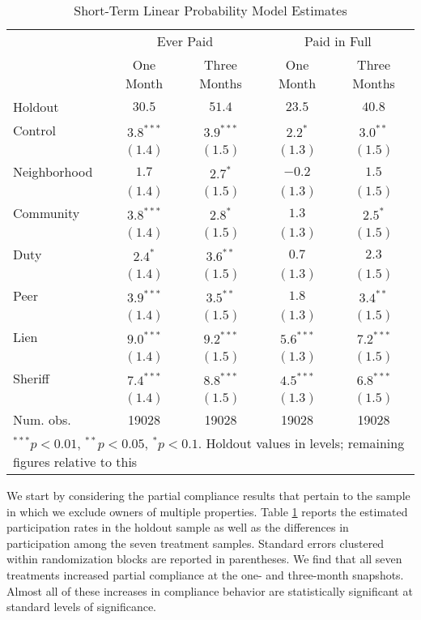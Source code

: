 \documentclass[12pt]{article}
\begin{document}
\begin{table}[ht]
\centering
\caption{Short-Term Linear Probability Model Estimates} \label{pc_lin}
\bigskip
\begin{tabular}{l c c c c }
\hline
 & \multicolumn{2}{c}{Ever Paid} & \multicolumn{2}{c}{Paid in Full} \\
          & One Month & Three Months & One Month & Three Months \\
Holdout   & $30.5$ & $51.4$ & $23.5$ & $40.8$ \\
\hline
Control   & $3.8^{***}$  & $3.9^{***}$  & $2.2^{*}$    & $3.0^{**}$   \\
          & $(1.4)$      & $(1.5)$      & $(1.3)$      & $(1.5)$      \\
Neighborhood & $1.7$        & $2.7^{*}$    & $-0.2$       & $1.5$        \\
          & $(1.4)$      & $(1.5)$      & $(1.3)$      & $(1.5)$      \\
Community     & $3.8^{***}$  & $2.8^{*}$    & $1.3$        & $2.5^{*}$    \\
          & $(1.4)$      & $(1.5)$      & $(1.3)$      & $(1.5)$      \\
Duty      & $2.4^{*}$    & $3.6^{**}$   & $0.7$        & $2.3$        \\
          & $(1.4)$      & $(1.5)$      & $(1.3)$      & $(1.5)$      \\
Peer      & $3.9^{***}$  & $3.5^{**}$   & $1.8$        & $3.4^{**}$   \\
          & $(1.4)$      & $(1.5)$      & $(1.3)$      & $(1.5)$      \\
Lien      & $9.0^{***}$  & $9.2^{***}$  & $5.6^{***}$  & $7.2^{***}$  \\
          & $(1.4)$      & $(1.5)$      & $(1.3)$      & $(1.5)$      \\
Sheriff   & $7.4^{***}$  & $8.8^{***}$  & $4.5^{***}$  & $6.8^{***}$  \\
          & $(1.4)$      & $(1.5)$      & $(1.3)$      & $(1.5)$      \\
\hline
Num. obs. & 19028        & 19028        & 19028        & 19028        \\
\hline
\multicolumn{5}{l}{\scriptsize{$^{***}p<0.01$, $^{**}p<0.05$,
    $^*p<0.1$. Holdout values in levels; remaining figures relative to
    this}}
\end{tabular}
\end{table}

We start by considering the partial compliance results that pertain to
the sample in which we exclude owners of multiple properties.  Table
\ref{pc_lin} reports the estimated participation rates in the holdout
sample as well as the differences in participation among the seven
treatment samples. Standard errors clustered within randomization
blocks are reported in parentheses. We
find that all seven treatments increased partial compliance at the
one- and three-month snapshots. Almost all of these increases in
compliance behavior are statistically significant at standard levels
of significance.
\end{document}
